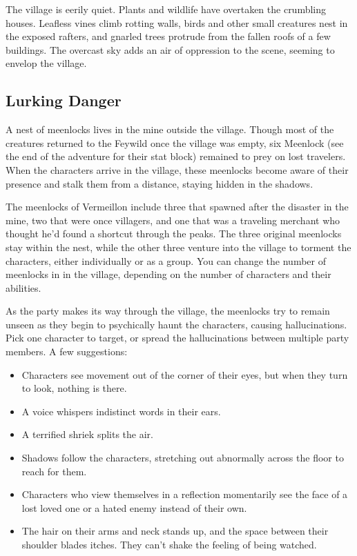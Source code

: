 \documentclass[10pt,a4paper,twoside,bg=print,twocolumn,openany,nodeprecatedcode]{dndbook}
\begin{document}
\begin{DndReadAloud}{}
The village is eerily quiet. Plants and wildlife have overtaken the crumbling houses. Leafless vines climb rotting walls, birds and other small creatures nest in the exposed rafters, and gnarled trees protrude from the fallen roofs of a few buildings. The overcast sky adds an air of oppression to the scene, seeming to envelop the village.

\end{DndReadAloud}

\subsection{Lurking Danger}
A nest of meenlocks lives in the mine outside the village. Though most of the creatures returned to the Feywild once the village was empty, six Meenlock (see the end of the adventure for their stat block) remained to prey on lost travelers. When the characters arrive in the village, these meenlocks become aware of their presence and stalk them from a distance, staying hidden in the shadows.

The meenlocks of Vermeillon include three that spawned after the disaster in the mine, two that were once villagers, and one that was a traveling merchant who thought he'd found a shortcut through the peaks. The three original meenlocks stay within the nest, while the other three venture into the village to torment the characters, either individually or as a group. You can change the number of meenlocks in in the village, depending on the number of characters and their abilities.

As the party makes its way through the village, the meenlocks try to remain unseen as they begin to psychically haunt the characters, causing hallucinations. Pick one character to target, or spread the hallucinations between multiple party members. A few suggestions:


\begin{itemize}
\item Characters see movement out of the corner of their eyes, but when they turn to look, nothing is there.
\item A voice whispers indistinct words in their ears.
\item A terrified shriek splits the air.
\item Shadows follow the characters, stretching out abnormally across the floor to reach for them.
\item Characters who view themselves in a reflection momentarily see the face of a lost loved one or a hated enemy instead of their own.
\item The hair on their arms and neck stands up, and the space between their shoulder blades itches. They can't shake the feeling of being watched.
\end{itemize}
\end{document}
